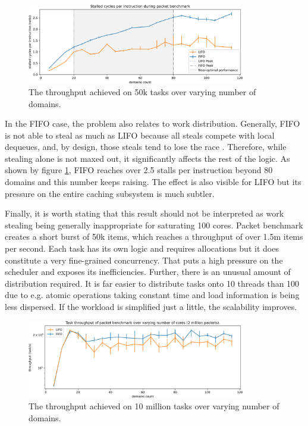 \documentclass[12pt,a4paper,twoside]{report}
\begin{document}
\begin{figure} 
     \centering 
     \includegraphics[width=0.85\textwidth]{eval/packet-basic-counters.png}
     \caption{The throughput achieved on 50k tasks over varying number of domains.}
    \label{fig:packet-counters}
\end{figure}

In the FIFO case, the problem also relates to work distribution. Generally, FIFO is not able to steal as much as LIFO because all steals compete with local dequeues, and, by design, those steals tend to lose the race . Therefore, while stealing alone is not maxed out, it significantly affects the rest of the logic. As shown by figure \ref{fig:packet-counters}, FIFO reaches over 2.5 stalls per instruction beyond 80 domains and this number keeps raising. The effect is also visible for LIFO but its pressure on the entire caching subsystem is much subtler.


Finally, it is worth stating that this result should not be interpreted as work stealing being generally inappropriate for saturating 100 cores. Packet benchmark creates a short burst of 50k items, which reaches a throughput of over 1.5m items per second. Each task has its own logic and requires allocations but it does constitute a very fine-grained concurrency. That puts a high pressure on the scheduler and exposes its inefficiencies. Further, there is an unusual amount of distribution required. It is far easier to distribute tasks onto 10 threads than 100 due to e.g. atomic operations taking constant time and load information is being less dispersed. If the workload is simplified just a little, the scalability improves. 

\begin{figure} 
     \centering
     \includegraphics[width=0.85\textwidth]{eval/packet-basic-10million-just-throughput.png}
     \caption{The throughput achieved on 10 million tasks over varying number of domains.}
    \label{fig:packet-10m-throughput}
\end{figure}
\end{document}

